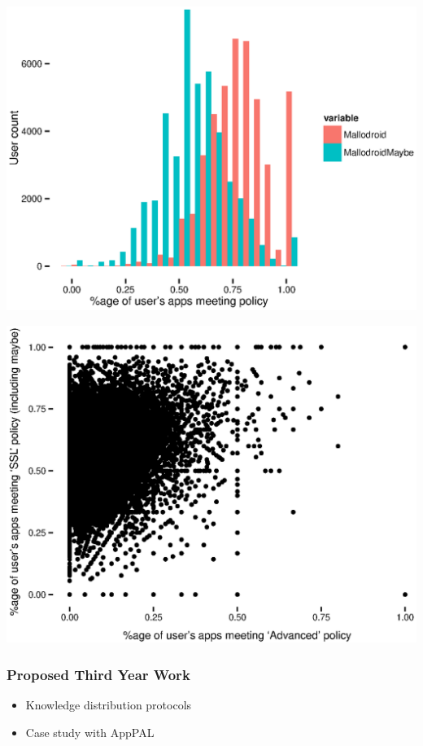 \documentclass{beamer}
\begin{document}
\begin{frame}
  \includegraphics[width=\linewidth]{presentation/mallodroid.eps}
\end{frame}
\begin{frame}
  \includegraphics[width=\linewidth]{presentation/advanced-v-mallodroid_m.eps}
\end{frame}


\begin{frame}
  \frametitle{Proposed Third Year Work}
  \begin{itemize}
  \item Knowledge distribution protocols
  \item Case study with AppPAL
  \end{itemize}
\end{frame}
\end{document}
